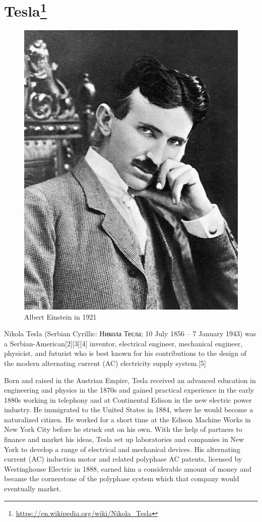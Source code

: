 \section*{Tesla\protect\footnote{\url{https://en.wikipedia.org/wiki/Nikola_Tesla}}}

\begin{figure}[ht]
  \centering
  \includegraphics[width=0.8\linewidth]{content/figures/nikola_tesla_picture.jpg}
  \caption{Albert Einstein in 1921\protect\footnotemark}
\end{figure}

Nikola Tesla (Serbian Cyrillic: Никола Тесла; 10 July 1856 – 7 January 1943) was a Serbian-American[2][3][4] inventor, electrical engineer, mechanical engineer, physicist, and futurist who is best known for his contributions to the design of the modern alternating current (AC) electricity supply system.[5]

Born and raised in the Austrian Empire, Tesla received an advanced education in engineering and physics in the 1870s and gained practical experience in the early 1880s working in telephony and at Continental Edison in the new electric power industry. He immigrated to the United States in 1884, where he would become a naturalized citizen. He worked for a short time at the Edison Machine Works in New York City before he struck out on his own. With the help of partners to finance and market his ideas, Tesla set up laboratories and companies in New York to develop a range of electrical and mechanical devices. His alternating current (AC) induction motor and related polyphase AC patents, licensed by Westinghouse Electric in 1888, earned him a considerable amount of money and became the cornerstone of the polyphase system which that company would eventually market.
